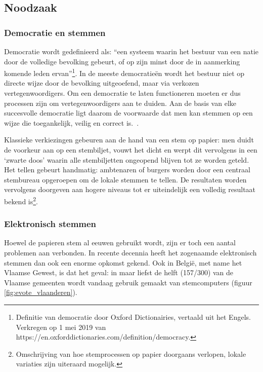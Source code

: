 	\subsection{Noodzaak}
			\subsubsection{Democratie en stemmen}
			Democratie wordt gedefinieerd als: ``een systeem waarin het bestuur van een natie door de volledige bevolking gebeurt, of op zijn minst door de in aanmerking komende leden ervan''\footnote{ Definitie van democratie door Oxford Dictionairies, vertaald uit het Engels. Verkregen op 1 mei 2019 van https://en.oxforddictionaries.com/definition/democracy.}. In de meeste democratieën wordt het bestuur niet op directe wijze door de bevolking uitgeoefend, maar via verkozen vertegenwoordigers. Om een democratie te laten functioneren moeten er dus processen zijn om vertegenwoordigers aan te duiden.  Aan de basis van elke succesvolle democratie ligt daarom de voorwaarde dat men kan stemmen op een wijze die toegankelijk, veilig en correct is.~\autocite{Osgood2016}. 
			
			Klassieke verkiezingen gebeuren aan de hand van een stem op papier: men duidt de voorkeur aan op een stembiljet, vouwt het dicht en werpt dit vervolgens in een `zwarte doos' waarin alle stembiljetten ongeopend blijven tot ze worden geteld. Het tellen gebeurt handmatig: ambtenaren of burgers worden door een centraal stembureau opgeroepen om de lokale stemmen te tellen. De resultaten worden vervolgens doorgeven aan hogere niveaus tot er uiteindelijk een volledig resultaat bekend is\footnote{Omschrijving van hoe stemprocessen op papier doorgaans verlopen, lokale variaties zijn uiteraard mogelijk.}.
			
			\subsubsection{Elektronisch stemmen}
			Hoewel de papieren stem al eeuwen gebruikt wordt, zijn er toch een aantal problemen aan verbonden. In recente decennia heeft het zogenaamde elektronisch stemmen dan ook een enorme opkomst gekend. Ook in België, met name het Vlaamse Gewest, is dat het geval: in maar liefst de helft (157/300) van de Vlaamse gemeenten wordt vandaag gebruik gemaakt van stemcomputers (figuur \ref{fig:evote_vlaanderen}).
			
